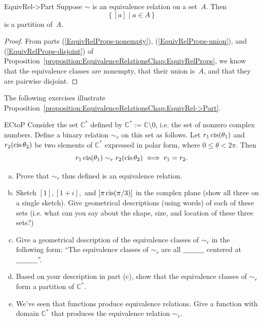 \begin{prop}{EquivRel->Part}
Suppose $\sim$ is an equivalence relation on a set~$A$. Then 
	$$ \{\, [a] \mid a \in A \,\} $$
is a partition of~$A$.
\end{prop}

\begin{proof}
From parts (\ref{EquivRelProps-nonempty}), (\ref{EquivRelProps-union}), and (\ref{EquivRelProps-disjoint}) of Proposition~\ref{proposition:EquivalenceRelationsChap:EquivRelProps}, we know that the equivalence classes are nonempty, that their union is~$A$, and that they are pairwise disjoint.
\end{proof}

The following exercises illustrate Proposition~\ref{proposition:EquivalenceRelationsChap:EquivRel->Part}.

\begin{exercise}{ECtoP}
Consider the set $\mathbb{C}^*$ defined by $\mathbb{C}^* := \mathbb{C} \setminus 0$, i.e. the set of nonzero complex numbers. Define a binary relation $\sim_r$ on this set as follows.  Let $ r_1 \operatorname{cis}(\theta_1)$ and $r_2(\operatorname{cis} \theta_2)$  be two elements of $\mathbb{C}^*$ expressed in polar form, where $0 \le \theta < 2\pi$. Then
\[ r_1 \operatorname{cis}(\theta_1) \sim_r r_2(\operatorname{cis} \theta_2)  \iff r_1 = r_2.\]

\begin{enumerate}[(a)]
\item
Prove that $\sim_r$ thus defined is an equivalence relation.
\item
Sketch $[1], [1+i],$  and $[\pi \operatorname{cis}(\pi/3)]$ in the complex plane (show all three on a single sketch). Give geometrical descriptions (using words) of each of these sets (i.e. what can you say about the shape, size, and location of these three sets?)
\item 
Give a geometrical description of the equivalence classes of $\sim_r$ in the following form:  ``The equivalence classes of $\sim_r$ are all $\_\_\_\_\_\_\_\_\_$ centered at $\_\_\_\_\_\_\_\_\_$''.
\item
Based on your description in part (c), show that the equivalence classes of $\sim_r$ form a partition of $\mathbb{C}^*$.
\item
We've seen that functions produce equivalence relations.  Give a function with domain $\mathbb{C}^*$ that produces the equivalence relation $\sim_r$. 
\end{enumerate}
\end{exercise}

